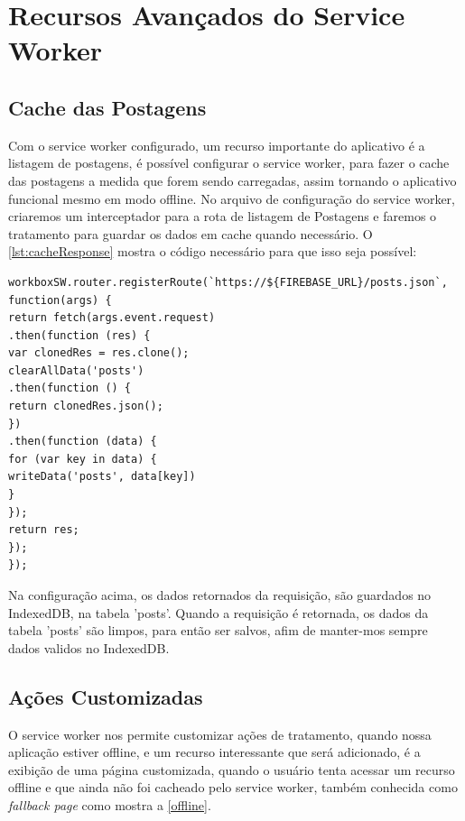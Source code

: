\vspace{-0.75cm}
\begin{center}
\end{center}

\section{Recursos Avançados do Service Worker}
\subsection*{Cache das Postagens}
Com o service worker configurado, um recurso importante do aplicativo é a listagem de postagens, é possível configurar o service worker, para fazer o cache das postagens a medida que forem sendo carregadas, assim tornando o aplicativo funcional mesmo em modo offline. No arquivo de configuração do service worker, criaremos um interceptador para a rota de listagem de Postagens e faremos o tratamento para guardar os dados em cache quando necessário. O \autoref{lst:cacheResponse} mostra o código necessário para que isso seja possível:
\begin{lstlisting}[frame=single,label=lst:cacheResponse,caption=Armazendo Post, basicstyle=\footnotesize]
workboxSW.router.registerRoute(`https://${FIREBASE_URL}/posts.json`, function(args) {
return fetch(args.event.request)
.then(function (res) {
var clonedRes = res.clone();
clearAllData('posts')
.then(function () {
return clonedRes.json();
})
.then(function (data) {
for (var key in data) {
writeData('posts', data[key])
}
});
return res;
});
});
\end{lstlisting}

\vspace{-0.75cm}
\begin{center}
\end{center}

Na configuração acima, os dados retornados da requisição, são guardados no IndexedDB, na tabela 'posts'. Quando a requisição é retornada, os dados da tabela 'posts' são limpos, para então ser salvos, afim de manter-mos sempre dados validos no IndexedDB.

\subsection*{Ações Customizadas}
O service worker nos permite customizar ações de tratamento, quando nossa aplicação estiver offline, e um recurso interessante que será adicionado, é a exibição de uma página customizada, quando o usuário tenta acessar um recurso offline e que ainda não foi cacheado pelo service worker, também conhecida como \textit{fallback page} como mostra a \autoref{offline}.

